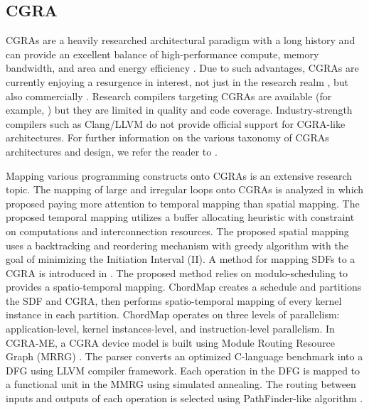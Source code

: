 \subsection{CGRA}
CGRAs are a heavily researched architectural paradigm with a long history and can provide an excellent balance of high-performance compute, memory bandwidth, and area and energy efficiency \cite{theodoridis2007survey}.
Due to such advantages, CGRAs are currently enjoying a resurgence in interest, not just in the research realm \cite{prabhakar2018plasticine}, but also commercially \cite{morgan2018intel, nicol2017coarse, vissers2019versal}.
Research compilers targeting CGRAs are available (for example, \cite{adriaansen2016code, chin_cgra-me_2017, mei2003exploiting, prabhakar2018plasticine}) but they are limited in quality and code coverage. 
Industry-strength compilers such as Clang/LLVM do not provide official support for CGRA-like architectures.
For further information on the various taxonomy of CGRAs architectures and design, we refer the reader to \cite{liu_survey_2019, tehre_survey_2012}.

Mapping various programming constructs onto CGRAs is an extensive research topic.
The  mapping of large and irregular loops onto CGRAs is analyzed in \cite{zhao_towards_2020} which proposed paying more attention to temporal mapping than spatial mapping. 
The proposed temporal mapping utilizes a buffer allocating heuristic with constraint on computations and interconnection resources. 
The proposed spatial mapping uses a backtracking and reordering mechanism with greedy algorithm with the goal of minimizing the Initiation Interval (II).
A method for mapping SDFs to a CGRA is introduced in \cite{li_chordmap_2022}.
The proposed method relies on modulo-scheduling to provides a spatio-temporal mapping.
ChordMap creates a schedule and partitions the SDF and CGRA, then performs spatio-temporal mapping of every kernel instance in each partition.
ChordMap operates on three levels of parallelism: application-level, kernel instances-level, and instruction-level parallelism.
In CGRA-ME\cite{chin_cgra-me_2017}, a CGRA device model is built using Module Routing Resource Graph (MRRG) \cite{mrrg}. 
The parser converts an optimized C-language benchmark into a DFG using LLVM compiler framework. 
Each operation in the DFG is mapped to a functional unit in the MMRG using simulated annealing. 
The routing between inputs and outputs of each operation is selected using PathFinder-like algorithm \cite{pathfinder}.

